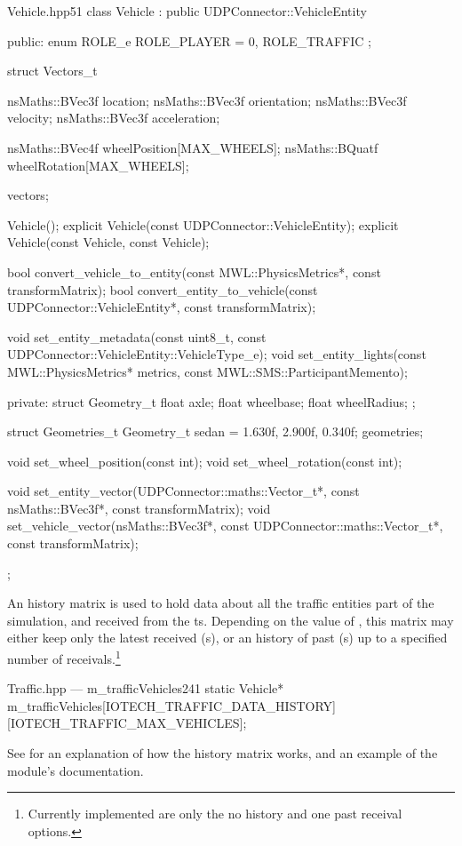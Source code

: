 \begin{codelist}{Vehicle.hpp}{51}
class Vehicle : public UDPConnector::VehicleEntity {
public:
	enum ROLE_e {
		ROLE_PLAYER = 0,
		ROLE_TRAFFIC
	};

	struct Vectors_t {
		nsMaths::BVec3f location;
		nsMaths::BVec3f orientation;
		nsMaths::BVec3f velocity;
		nsMaths::BVec3f acceleration;

		nsMaths::BVec4f wheelPosition[MAX_WHEELS];
		nsMaths::BQuatf wheelRotation[MAX_WHEELS];
	} vectors;

	Vehicle();
	explicit Vehicle(const UDPConnector::VehicleEntity);
	explicit Vehicle(const Vehicle, const Vehicle);

	bool convert_vehicle_to_entity(const MWL::PhysicsMetrics*, const transformMatrix);
	bool convert_entity_to_vehicle(const UDPConnector::VehicleEntity*, const transformMatrix);

	void set_entity_metadata(const uint8_t, const UDPConnector::VehicleEntity::VehicleType_e);
	void set_entity_lights(const MWL::PhysicsMetrics* metrics, const MWL::SMS::ParticipantMemento);

private:
	struct Geometry_t {
		float axle;
		float wheelbase;
		float wheelRadius;
	};

	struct Geometries_t {
		Geometry_t sedan = {1.630f, 2.900f, 0.340f};
	} geometries;

	void set_wheel_position(const int);
	void set_wheel_rotation(const int);

	void set_entity_vector(UDPConnector::maths::Vector_t*, const nsMaths::BVec3f*, const transformMatrix);
	void set_vehicle_vector(nsMaths::BVec3f*, const UDPConnector::maths::Vector_t*, const transformMatrix);
};
\end{codelist}

An history matrix is used to hold data about all the traffic entities part of the simulation, and received from the \gls{ts}. Depending on the value of , this matrix may either keep only the latest received (s), or an history of past (s) up to a specified number of receivals.\footnote{Currently implemented are only the no history and one past receival options.}

\begin{codelist}{Traffic.hpp --- m\_trafficVehicles}{241}
	static Vehicle* m_trafficVehicles[IOTECH_TRAFFIC_DATA_HISTORY][IOTECH_TRAFFIC_MAX_VEHICLES];
\end{codelist}

See  for an explanation of how the history matrix works, and an example of the module's documentation.

